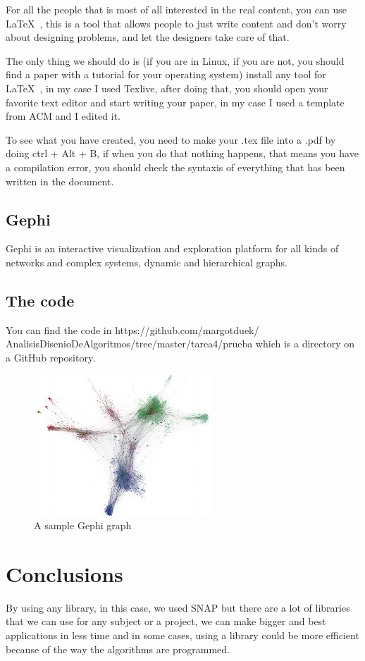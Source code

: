 \documentclass{sig-alternate-05-2015}
\begin{document}
For all the people that is most of all interested in the real
content, you can use \LaTeX\ , this is a tool that allows people
to just write content and don't worry about designing problems,
and let the designers take care of that.

The only thing we should do is (if you are in Linux, if you are not,
you should find a paper with a tutorial for your operating system)
install any tool for \LaTeX\ , in my case I used Texlive, after
doing that, you should open your favorite text editor and start
writing your paper, in my case I used a template from ACM
and I edited it.

To see what you have created, you need to make your .tex file into a
.pdf by doing ctrl + Alt + B, if when you do that nothing happens,
that means you have a compilation error, you should check the syntaxis
of everything that has been written in the document.


\subsection{Gephi}
Gephi is an interactive visualization and exploration platform
for all kinds of networks and complex systems,
dynamic and hierarchical graphs.

\subsection{The code}
You can find the code in https://github.com/margotduek/
AnalisisDisenioDeAlgoritmos/tree/master/tarea4/prueba
which is a directory on a GitHub repository.

\begin{figure}
\centering
\includegraphics{gephi}
\caption{A sample Gephi graph}
\end{figure}

\section{Conclusions}
By using any library, in this case, we used SNAP but there
are a lot of libraries that we can use for any subject or
a project, we can make bigger and best applications in less time
and in some cases, using a library could be more efficient
because of the way the algorithms are programmed.
\end{document}
